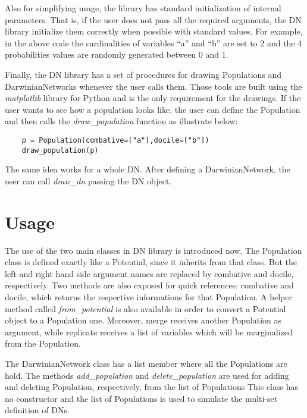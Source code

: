 Also for simplifying usage, the library has standard initialization of internal parameters.
That is, if the user does not pass all the required arguments, the DN library initialize them correctly when possible with standard values.
For example, in the above code the cardinalities of variables ``a'' and ``b'' are set to 2 and the 4 probabilities values are randomly generated between 0 and 1.

Finally, the DN library has a set of procedures for drawing Populations and DarwinianNetworks whenever the user calls them.
Those tools are built using the \emph{matplotlib} library for Python and is the only requirement for the drawings.
If the user wants to see how a population looks like, the user can define the Population and then calls the \emph{draw\_population} function as illustrate below:
\begin{verbatim}
    p = Population(combative=["a"],docile=["b"])
    draw_population(p)
\end{verbatim}
The same idea works for a whole DN.
After defining a DarwinianNetwork, the user can call \emph{draw\_dn} passing the DN object.

\section{Usage}
\label{sec:system:sec3}

The use of the two main classes in DN library is introduced now.
The Population class is defined exactly like a Potential, since it inherits from that class.
But the left and right hand side argument names are replaced by combative and docile, respectively.
Two methods are also exposed for quick references: combative and docile, which returns the respective informations for that Population.
A helper method called \emph{from\_potential} is also available in order to convert a Potential object to a Population one.
Moreover, merge receives another Population as argument, while replicate receives a list of variables which will be marginalized from the Population.

The DarwinianNetwork class has a list member where all the Populations are hold.
The methods \emph{add\_population} and \emph{delete\_population} are used for adding and deleting Population, respectively, from the list of Populations
This class has no constructor and the list of Populations is used to simulate the multi-set definition of DNs.
